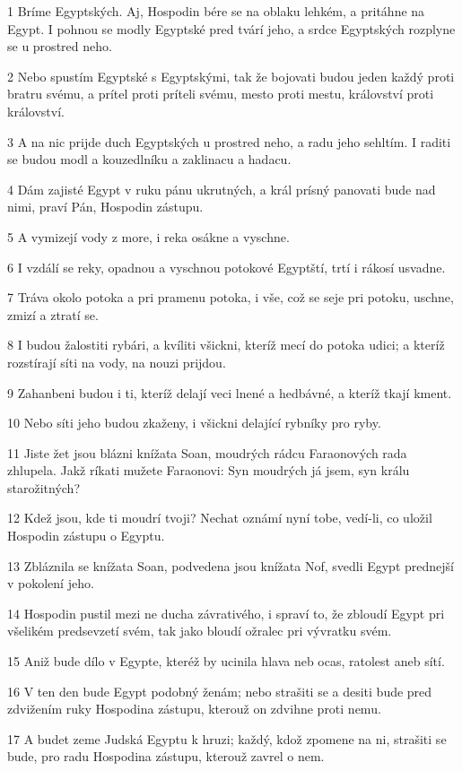 \par 1 Bríme Egyptských. Aj, Hospodin bére se na oblaku lehkém, a pritáhne na Egypt. I pohnou se modly Egyptské pred tvárí jeho, a srdce Egyptských rozplyne se u prostred neho.
\par 2 Nebo spustím Egyptské s Egyptskými, tak že bojovati budou jeden každý proti bratru svému, a prítel proti príteli svému, mesto proti mestu, království proti království.
\par 3 A na nic prijde duch Egyptských u prostred neho, a radu jeho sehltím. I raditi se budou modl a kouzedlníku a zaklinacu a hadacu.
\par 4 Dám zajisté Egypt v ruku pánu ukrutných, a král prísný panovati bude nad nimi, praví Pán, Hospodin zástupu.
\par 5 A vymizejí vody z more, i reka osákne a vyschne.
\par 6 I vzdálí se reky, opadnou a vyschnou potokové Egyptští, trtí i rákosí usvadne.
\par 7 Tráva okolo potoka a pri pramenu potoka, i vše, což se seje pri potoku, uschne, zmizí a ztratí se.
\par 8 I budou žalostiti rybári, a kvíliti všickni, kteríž mecí do potoka udici; a kteríž rozstírají síti na vody, na nouzi prijdou.
\par 9 Zahanbeni budou i ti, kteríž delají veci lnené a hedbávné, a kteríž tkají kment.
\par 10 Nebo síti jeho budou zkaženy, i všickni delající rybníky pro ryby.
\par 11 Jiste žet jsou blázni knížata Soan, moudrých rádcu Faraonových rada zhlupela. Jakž ríkati mužete Faraonovi: Syn moudrých já jsem, syn králu starožitných?
\par 12 Kdež jsou, kde ti moudrí tvoji? Nechat oznámí nyní tobe, vedí-li, co uložil Hospodin zástupu o Egyptu.
\par 13 Zbláznila se knížata Soan, podvedena jsou knížata Nof, svedli Egypt prednejší v pokolení jeho.
\par 14 Hospodin pustil mezi ne ducha závrativého, i spraví to, že zbloudí Egypt pri všelikém predsevzetí svém, tak jako bloudí ožralec pri vývratku svém.
\par 15 Aniž bude dílo v Egypte, kteréž by ucinila hlava neb ocas, ratolest aneb sítí.
\par 16 V ten den bude Egypt podobný ženám; nebo strašiti se a desiti bude pred zdvižením ruky Hospodina zástupu, kterouž on zdvihne proti nemu.
\par 17 A budet zeme Judská Egyptu k hruzi; každý, kdož zpomene na ni, strašiti se bude, pro radu Hospodina zástupu, kterouž zavrel o nem.
